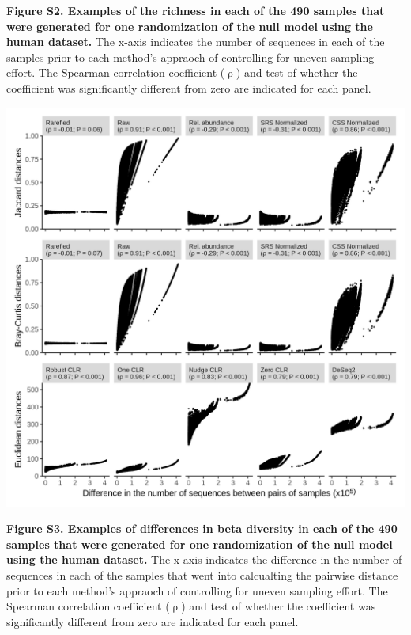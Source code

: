 \documentclass[
]{article}
\begin{document}
\textbf{Figure S2. Examples of the richness in each of the 490 samples
that were generated for one randomization of the null model using the
human dataset.} The x-axis indicates the number of sequences in each of
the samples prior to each method's appraoch of controlling for uneven
sampling effort. The Spearman correlation coefficient (\(\uprho\)) and
test of whether the coefficient was significantly different from zero
are indicated for each panel.

\newpage

\includegraphics{figure_s3.png}

\textbf{Figure S3. Examples of differences in beta diversity in each of
the 490 samples that were generated for one randomization of the null
model using the human dataset.} The x-axis indicates the difference in
the number of sequences in each of the samples that went into
calcualting the pairwise distance prior to each method's appraoch of
controlling for uneven sampling effort. The Spearman correlation
coefficient (\(\uprho\)) and test of whether the coefficient was
significantly different from zero are indicated for each panel.
\end{document}
